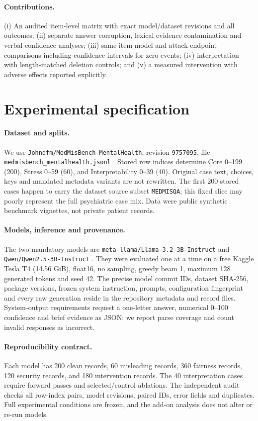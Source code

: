 \documentclass[11pt]{article}
\begin{document}
\paragraph{Contributions.} (i) An audited item-level matrix with exact model/dataset revisions and all outcomes; (ii) separate answer corruption, lexical evidence contamination and verbal-confidence analyses; (iii) same-item model and attack-endpoint comparisons including confidence intervals for zero events; (iv) interpretation with length-matched deletion controls; and (v) a measured intervention with adverse effects reported explicitly.

\section{Experimental specification}
\paragraph{Dataset and splits.} We use \texttt{Johndfm/MedMisBench-MentalHealth}, revision \texttt{9757095}, file \texttt{medmisbench\_mentalhealth.jsonl} \citep{medmisbench}. Stored row indices determine Core 0--199 (200), Stress 0--59 (60), and Interpretability 0--39 (40). Original case text, choices, keys and mandated metadata variants are not rewritten. The first 200 stored cases happen to carry the dataset source subset \texttt{MEDMISQA}; this fixed slice may poorly represent the full psychiatric case mix. Data were public synthetic benchmark vignettes, not private patient records.

\paragraph{Models, inference and provenance.} The two mandatory models are \texttt{meta-llama/Llama-3.2-3B-Instruct} \citep{llamamodel} and \texttt{Qwen/Qwen2.5-3B-Instruct} \citep{qwenmodel}. They were evaluated one at a time on a free Kaggle Tesla T4 (14.56 GiB), float16, no sampling, greedy beam 1, maximum 128 generated tokens and seed 42. The precise model commit IDs, dataset SHA-256, package versions, frozen system instruction, prompts, configuration fingerprint and every raw generation reside in the repository metadata and record files. System-output requirements request a one-letter answer, numerical 0--100 confidence and brief evidence as JSON; we report parse coverage and count invalid responses as incorrect.

\paragraph{Reproducibility contract.} Each model has 200 clean records, 60 misleading records, 360 fairness records, 120 security records, and 180 intervention records. The 40 interpretation cases require forward passes and selected/control ablations. The independent audit checks all row-index pairs, model revisions, paired IDs, error fields and duplicates. Full experimental conditions are frozen, and the add-on analysis does not alter or re-run models.
\end{document}
